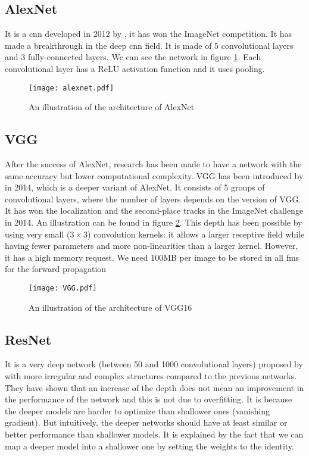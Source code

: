 \subsection{AlexNet}
It is a \acrshort{cnn} developed in 2012 by \textcite{krizhevsky_imagenet_2012}, it has won the ImageNet competition. It has made a breakthrough in the deep \acrshort{cnn} field. It is made of 5 convolutional layers and 3 fully-connected layers. We can see the network in figure \ref{fig:alexnet}. Each convolutional layer has a ReLU activation function and it uses pooling.
%
\begin{figure}
    \centering
    \texttt{[image: alexnet.pdf]}
    \caption{An illustration of the architecture of AlexNet \cite{krizhevsky_imagenet_2012}}
    \label{fig:alexnet}
\end{figure}
%
\subsection{VGG}
After the success of AlexNet, research has been made to have a network with the same accuracy but lower computational complexity. VGG has been introduced by \textcite{simonyan_very_2015} in 2014, which is a deeper variant of AlexNet. It consists of 5 groups of convolutional layers, where the number of layers depends on the version of VGG. It has won the localization and the second-place tracks in the ImageNet challenge in 2014. An illustration can be found in figure \ref{fig:vgg}. This depth has been possible by using very small ($3 \times 3$) convolution kernels: it allows a larger receptive field while having fewer parameters and more non-linearities than a larger kernel. However, it has a high memory request. We need 100MB per image to be stored in all \acrshort{fm}s for the forward propagation
%
\begin{figure}
    \centering
    \texttt{[image: VGG.pdf]}
    \caption{An illustration of the architecture of VGG16 \cite{simonyan_very_2015}}
    \label{fig:vgg}
\end{figure}
%
\subsection{ResNet}
It is a very deep network (between 50 and 1000 convolutional layers) proposed by \textcite{he_deep_2015} with more irregular and complex structures compared to the previous networks. They have shown that an increase of the depth does not mean an improvement in the performance of the network and this is not due to overfitting. It is because the deeper models are harder to optimize than shallower ones (vanishing gradient). But intuitively, the deeper networks should have at least similar or better performance than shallower models. It is explained by the fact that we can map a deeper model into a shallower one by setting the weights to the identity.

